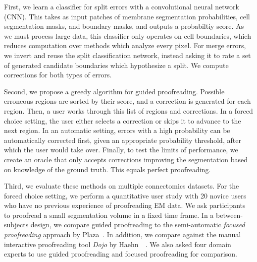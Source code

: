 First, we learn a classifier for split errors with a convolutional neural network (CNN). This takes as input patches of membrane segmentation probabilities, cell segmentation masks, and boundary masks, and outputs a probabiltiy score. As we must process large data, this classifier only operates on cell boundaries, which reduces computation over methods which analyze every pixel. For merge errors, we invert and reuse the split classification network, instead asking it to rate a set of generated candidate boundaries which hypothesize a split. We compute corrections for both types of errors.

Second, we propose a greedy algorithm for guided proofreading. Possible erroneous regions are sorted by their score, and a correction is generated for each region. Then, a user works through this list of regions and corrections. In a forced choice setting, the user either selects a correction or skips it to advance to the next region. In an automatic setting, errors with a high probability can be automatically corrected first, given an appropriate probability threshold, after which the user would take over. Finally, to test the limits of performance, we create an oracle that only accepts corrections improving the segmentation based on knowledge of the ground truth. This equals perfect proofreading.

Third, we evaluate these methods on multiple connectomics datasets. For the forced choice setting, we perform a quantitative user study with 20 novice users who have no previous experience of proofreading EM data. We ask participants to proofread a small segmentation volume in a fixed time frame. In a between-subjects design, we compare guided proofreading to the semi-automatic \textit{focused proofreading} approach by Plaza~\cite{focused_proofreading}. In addition, we compare against the manual interactive proofreading tool \textit{Dojo} by Haehn~\etal~\cite{haehn_dojo_2014}. We also asked four domain experts to use guided proofreading and focused proofreading for comparison.

